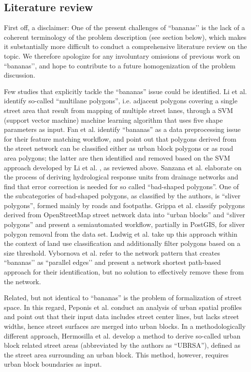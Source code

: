 \subsection*{Literature review}

First off, a disclaimer: One of the present challenges of ``bananas’’ is the lack of a coherent terminology of the problem description (see section below), which makes it substantially more difficult to conduct a comprehensive literature review on the topic. We therefore apologize for any involuntary omissions of previous work on ``bananas’’, and hope to contribute to a future homogenization of the problem discussion.

Few studies that explicitly tackle the ``bananas'' issue could be identified. Li et al. \cite{li_polygon-based_2014} identify so-called ``multilane polygons'', i.e. adjacent polygons covering a single street area that result from mapping of multiple street lanes, through a SVM (support vector machine) machine learning algorithm that uses five shape parameters as input. Fan et al. \cite{fan_polygon-based_2016} identify ``bananas'' as a data preprocessing issue for their feature matching workflow, and point out that polygons derived from the street network can be classified either as urban block polygons or as road area polygons; the latter are then identified and removed based on the SVM approach developed by Li et al. \cite{li_polygon-based_2014}, as reviewed above. Sanzana et al. \cite{sanzana_decomposition_2018} elaborate on the process of deriving hydrological response units from drainage networks and find that error correction is needed for so called ``bad-shaped polygons''. One of the subcategories of bad-shaped polygons, as classified by the authors, is ``sliver polygons'', formed mainly by roads and footpaths. Grippa et al. \cite{grippa_mapping_2018} classify polygons derived from OpenStreetMap street network data into ``urban blocks'' and ``sliver polygons'' and present a semiautomated workflow, partially in PostGIS, for sliver polygon removal from the data set. Ludwig et al. \cite{ludwig_mapping_2021} take up this approach within the context of land use classification and additionally filter polygons based on a size threshold. Vybornova et al. \cite{vybornova_automated_2022} refer to the network pattern that creates ``bananas’’ as ``parallel edges’’ and present a network shortest path-based approach for their identification, but no solution to effectively remove these from the network. 

Related, but not identical to ``bananas'' is the problem of formalization of street space. In this regard, Peponis et al. \cite{peponis_measuring_2007} conduct an analysis of urban spatial profiles and point out that their input data includes street center lines, but lacks street widths, hence street surfaces are merged into urban blocks. In a methodologically different approach, Hermosilla et al. \cite{hermosilla_using_2014} develop a method to derive so-called urban block related street areas (abbreviated by the authors as ``UBRSA''), defined as the street area surrounding an urban block. This method, however, requires urban block boundaries as input.


